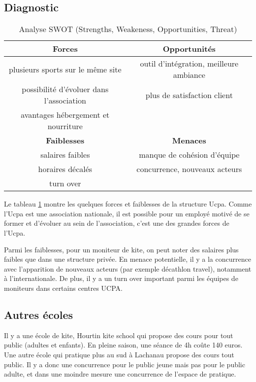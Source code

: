 \documentclass[11pt,a4paper]{report}
\begin{document}
\subsection{Diagnostic}
\begin{table}[h]
\centering
\begin{tabular}{|c|c|}
        \hline
        \textbf{Forces}                          & \textbf{Opportunités} \\ 
        \hline
        plusieurs sports sur le m\^eme site      &  outil d'intégration, meilleure ambiance\\
        possibilité d'évoluer dans l'association & plus de satisfaction client  \\
        avantages hébergement et nourriture      &                              \\
        \hline
        \textbf{Faiblesses}                      &  \textbf{Menaces} \\ 
        \hline
        salaires faibles                         & manque de cohésion d'équipe \\
        horaires décalés                         & concurrence, nouveaux acteurs   \\
        turn over                                &                               \\
        \hline
\end{tabular}
\caption{Analyse SWOT (Strengths, Weakeness, Opportunities, Threat)\label{swot}}
\end{table}
Le tableau \ref{swot} montre les quelques forces et faiblesses de la 
structure Ucpa. Comme l'Ucpa est une association nationale, il est 
possible pour un  employé motivé de se former et d'évoluer
au sein de l'association, c'est une des grandes forces de l'Ucpa.
 
Parmi les faiblesses, pour un moniteur de kite, on peut noter des
salaires plus faibles que dans une structure privée. 
En menace potentielle, il y a  la concurrence avec 
l’apparition de nouveaux acteurs (par exemple décathlon travel),
notamment à l'internationale. De plus, il  y a un turn over
important parmi les équipes  de moniteurs dans certains centres UCPA.

\subsection{Autres écoles}
Il y a une école de kite, Hourtin kite school
qui propose des cours pour tout public (adultes et enfants). 
En pleine saison, une séance de 4h co\^ute 140 euros.
Une autre école qui pratique plus au sud à Lachanau propose
des cours tout public.
Il y a donc une concurrence pour le public jeune mais pas pour le public adulte, et
dans une moindre mesure une concurrence de l'espace de pratique.
\end{document}
